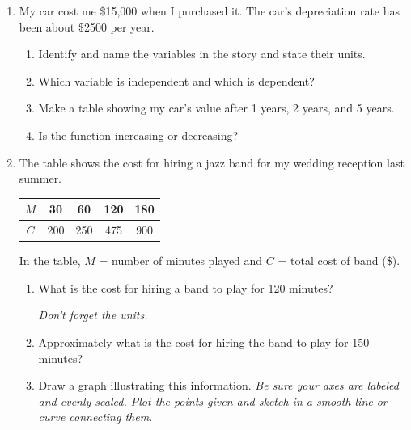 \documentclass[12pt]{article}
\begin{document}
\begin{enumerate}

\item My car cost me \$15,000 when I purchased it.  The car's depreciation rate has been about \$2500 per year.

\begin{enumerate}
\item Identify and name the variables in the story and state their units.
\vfill
\item Which variable is independent and which is dependent?
\vfill
\item Make a table showing my car's value after 1 years, 2 years, and 5 years.
\vfill
\vfill
\vfill
\item Is the function increasing or decreasing?
\vfill
\end{enumerate}

\newpage

\item The table shows the cost for hiring a jazz band for my wedding reception last summer.  

\begin{center}
\begin{tabular} {|c|c|c|c|c|} \hline
$M$ & 30 & 60 & 120 & 180 \\ \hline
$C$ & 200 & 250 & 475 & 900 \\ \hline
\end{tabular}
\end{center}

In the table, $M$ = number of minutes played and $C$ = total cost of band  (\$).

\begin{enumerate}
\item What is the cost for hiring a band to play for 120 minutes?

\emph{Don't forget the units.}
\vfill
\item Approximately what is the cost for hiring the band to play for 150 minutes?
\vfill
\item Draw a graph illustrating this information.  \emph{Be sure your axes are labeled and evenly scaled.  Plot the points given and sketch in a smooth line or curve connecting them.}


\end{enumerate}
\end{enumerate}
\end{document}
